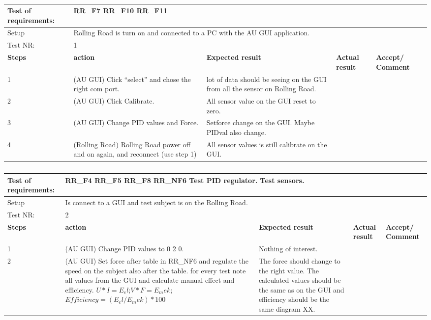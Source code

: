 \begin{table}[h!]
	\centering
	\label{my-label}	
	\begin{tabular}{|p{1.5 cm}|p{4.2 cm}|p{2.1 cm}|p{2.1 cm}|p{2.1 cm}|}
		\hline
		Test of requirements: 
		& \multicolumn{4}{l|}{RR\_F7 RR\_F10 RR\_F11} \\ \hline
		Setup 
		& \multicolumn{4}{l|}{Rolling Road is turn on and connected to a PC with the AU GUI application.} \\ \hline
		Test NR:
		& \multicolumn{4}{l|}{1} \\ \hline
		\textbf{Steps} & \textbf{action} & \textbf{Expected result} & 
		\textbf{Actual result} & \textbf{Accept/ Comment} \\ \hline
		1 
		& (AU GUI) Click “select” and chose the right com port. 
		& lot of data should be seeing on the GUI from all the sensor on Rolling Road.
		&
		& \\ \hline
		2
		& (AU GUI) Click Calibrate.
		& All sensor value on the GUI reset to zero.
		&
		& \\ \hline
		3
		& (AU GUI) Change PID values and Force.
		& Setforce change on the GUI. Maybe PIDval also change.
		&
		& \\ \hline
		4
		& (Rolling Road) Rolling Road power off and on again, and reconnect (use step 1)
		& All sensor values is still calibrate on the GUI.
		&
		& \\ \hline
	\end{tabular}
	\caption{}
\end{table}


\begin{table}[h!]
	\centering
	\label{my-label}	
	\begin{tabular}{|p{1.5 cm}|p{4.2 cm}|p{2.1 cm}|p{2.1 cm}|p{2.1 cm}|}
		\hline
		Test of requirements: 
		& \multicolumn{4}{l|}{RR\_F4 RR\_F5 RR\_F8 RR\_NF6 Test PID regulator. Test sensors.} \\ \hline
		Setup 
		& \multicolumn{4}{l|}{Is connect to a GUI and test subject is on the Rolling Road.} \\ \hline
		Test NR:
		& \multicolumn{4}{l|}{2} \\ \hline
		\textbf{Steps} & \textbf{action} & \textbf{Expected result} & 
		\textbf{Actual result} & \textbf{Accept/ Comment} \\ \hline
		1 
		& (AU GUI) Change PID values to 0 2 0. 
		& Nothing of interest.
		&
		& \\ \hline
		2
		& (AU GUI) Set force after table in RR\_NF6 and regulate the speed on the subject also after the table. for every test note all values from the GUI and calculate manual effect and efficiency. $ U*I=E_el $;$ V*F=E_mek $; $ Efficiency=(E_el/E_mek)*100 $
		& The force should change to the right value. The calculated values should be the same as on the GUI and efficiency should be the same diagram XX.
		&
		& \\ \hline
	\end{tabular}
	\caption{}
\end{table}

